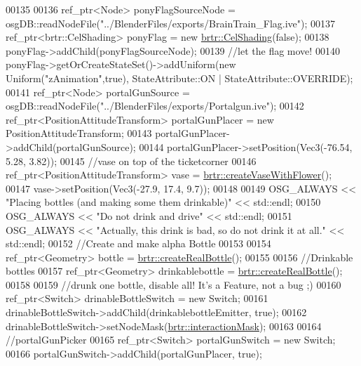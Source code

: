 \begin{DoxyCode}
00135 
00136     ref\_ptr<Node> ponyFlagSourceNode = osgDB::readNodeFile(\textcolor{stringliteral}{"../BlenderFiles/exports/BrainTrain\_Flag.ive"});
00137     ref\_ptr<brtr::CelShading> ponyFlag = \textcolor{keyword}{new} \hyperlink{classbrtr_1_1_cel_shading}{brtr::CelShading}(\textcolor{keyword}{false});
00138     ponyFlag->addChild(ponyFlagSourceNode);
00139     \textcolor{comment}{//let the flag move!}
00140     ponyFlag->getOrCreateStateSet()->addUniform(\textcolor{keyword}{new} Uniform(\textcolor{stringliteral}{"zAnimation"},\textcolor{keyword}{true}), StateAttribute::ON | 
      StateAttribute::OVERRIDE);
00141     ref\_ptr<Node> portalGunSource = osgDB::readNodeFile(\textcolor{stringliteral}{"../BlenderFiles/exports/Portalgun.ive"});
00142     ref\_ptr<PositionAttitudeTransform> portalGunPlacer = \textcolor{keyword}{new} PositionAttitudeTransform;
00143     portalGunPlacer->addChild(portalGunSource);
00144     portalGunPlacer->setPosition(Vec3(-76.54, 5.28, 3.82));
00145     \textcolor{comment}{//vase on top of the ticketcorner}
00146     ref\_ptr<PositionAttitudeTransform> vase = \hyperlink{namespacebrtr_a05625aff9337331ae351d283f79f0f1e}{brtr::createVaseWithFlower}();
00147     vase->setPosition(Vec3(-27.9, 17.4, 9.7));
00148     
00149     OSG\_ALWAYS << \textcolor{stringliteral}{"Placing bottles (and making some them drinkable)"} << std::endl;
00150     OSG\_ALWAYS << \textcolor{stringliteral}{"Do not drink and drive"} << std::endl;
00151     OSG\_ALWAYS << \textcolor{stringliteral}{"Actually, this drink is bad, so do not drink it at all."} << std::endl;
00152     \textcolor{comment}{//Create and make alpha Bottle}
00153 
00154     ref\_ptr<Geometry> bottle = \hyperlink{namespacebrtr_a614d8d6b8bcc6c4e7f7ffb24ca48eb4c}{brtr::createRealBottle}();
00155     
00156     \textcolor{comment}{//Drinkable bottles}
00157     ref\_ptr<Geometry> drinkablebottle = \hyperlink{namespacebrtr_a614d8d6b8bcc6c4e7f7ffb24ca48eb4c}{brtr::createRealBottle}();
00158    
00159     \textcolor{comment}{//drunk one bottle, disable all! It's a Feature, not a bug ;)}
00160     ref\_ptr<Switch> drinableBottleSwitch = \textcolor{keyword}{new} Switch;
00161     drinableBottleSwitch->addChild(drinkablebottleEmitter, \textcolor{keyword}{true});
00162     drinableBottleSwitch->setNodeMask(\hyperlink{namespacebrtr_a2060f4d70c0e3bc7e2e35f82e279a40d}{brtr::interactionMask});
00163 
00164     \textcolor{comment}{//portalGunPicker}
00165     ref\_ptr<Switch> portalGunSwitch = \textcolor{keyword}{new} Switch;
00166     portalGunSwitch->addChild(portalGunPlacer, \textcolor{keyword}{true});

\end{DoxyCode}
